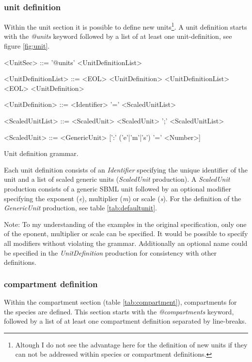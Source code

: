 \documentclass[a4paper]{article}
\begin{document}
\subsubsection*{unit definition}
Within the unit section it is possible to define new units\footnote{Altough I do not see the advantage here for the definition of new units if they can not be addressed within species or compartment definitions.}. A unit definition starts with the \emph{@units} keyword followed by a list of at least one unit-definition, see figure \ref{fig:unit}. 

\begin{table}[h!]
\begin{grammar}
<UnitSec> ::= '@units' <UnitDefinitionList>

<UnitDefinitionList> ::= <EOL> <UnitDefinition> <UnitDefinitionList>
  \alt <EOL> <UnitDefinition>
  
<UnitDefinition> ::= <Identifier> '=' <ScaledUnitList> 

<ScaledUnitList> ::= <ScaledUnit>
  \alt <ScaledUnit> ';' <ScaledUnitList>

<ScaledUnit> ::= <GenericUnit> [':' ('e'|'m'|'s') '=' <Number>]
\end{grammar}
\caption{Unit definition grammar.} \label{fig:unit}
\end{table}
Each unit definition consists of an \emph{Identifier} specifying the unique identifier of the unit and a list of scaled generic units (\emph{ScaledUnit} production). A \emph{ScaledUnit} production consists of a generic SBML unit followed by an optional modifier specifying the exponent (\emph{e}), multiplier (\emph{m}) or scale (\emph{s}). For the definition of the \emph{GenericUnit} production, see table \ref{tab:defaultunit}.

Note: To my understanding of the examples in the original specification, only one of the eponent, multiplier or scale can be specified. It would be possible to specify all modifiers without violating the grammar. Additionally an optional name could be specified in the \emph{UnitDefinition} production for consistency with other definitions.


\subsubsection*{compartment definition}
Within the compartment section (table \ref{tab:compartment}), compartments for the species are defined. This section starts with the \emph{@compartments} keyword, followed by a list of at least one compartment definition separated by line-breaks.
\end{document}
